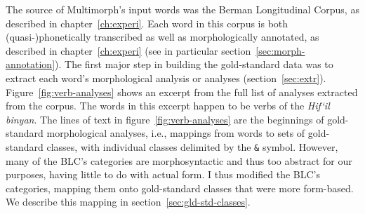 The source of Multimorph's input words was the 
Berman Longitudinal Corpus, as described in chapter~\ref{ch:experi}. Each word in this corpus is both (quasi-)phonetically 
transcribed as well as morphologically annotated, as described in chapter~\ref{ch:experi} 
(see in particular section~\ref{sec:morph-annotation}).
The first major step in 
building the gold-standard data was to extract each word's morphological analysis 
or analyses (section~\ref{sec:extr}). Figure~\ref{fig:verb-analyses} shows an excerpt from the full list
of analyses extracted from the corpus. The words in this excerpt happen to be verbs of the \textit{Hif`il}
\emph{binyan}. The lines of text in figure~\ref{fig:verb-analyses} are the 
beginnings of gold-standard morphological analyses, i.e., 
mappings from words to sets of gold-standard classes, with individual classes delimited by the 
\texttt{\&} symbol.  However, many of the BLC's categories are morphosyntactic and thus too abstract for our purposes, having little 
to do with actual form. I thus modified the BLC's categories, mapping them onto gold-standard classes that were
more form-based. We describe this mapping in section~\ref{sec:gld-std-classes}. 

